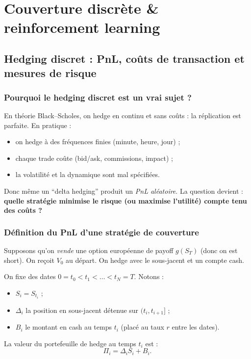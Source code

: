 \documentclass[11pt,a4paper]{report}
\newcommand{\1}{\mathbbm{1}}
\theoremstyle{definition}
\theoremstyle{plain}
\theoremstyle{remark}
\begin{document}
\part{Couverture discrète \& reinforcement learning}

\chapter{Hedging discret : PnL, coûts de transaction et mesures de risque}
\label{chap:discrete_hedging}

\section{Pourquoi le hedging discret est un vrai sujet ?}
En théorie Black--Scholes, on hedge en continu et sans coûts : la réplication est parfaite.
En pratique :
\begin{itemize}
  \item on hedge à des fréquences finies (minute, heure, jour) ;
  \item chaque trade coûte (bid/ask, commissions, impact) ;
  \item la volatilité et la dynamique sont mal spécifiées.
\end{itemize}
Donc même un ``delta hedging'' produit un \emph{PnL aléatoire}.
La question devient : \textbf{quelle stratégie minimise le risque (ou maximise l'utilité) compte tenu des coûts ?}

\section{Définition du PnL d'une stratégie de couverture}
\label{sec:pnl_definition}

Supposons qu'on \emph{vende} une option européenne de payoff $g(S_T)$ (donc on est short).
On reçoit $V_0$ au départ. On hedge avec le sous-jacent et un compte cash.

On fixe des dates $0=t_0<t_1<\dots<t_N=T$.
Notons :
\begin{itemize}
  \item $S_i=S_{t_i}$ ;
  \item $\Delta_i$ la position en sous-jacent détenue sur $(t_i,t_{i+1}]$ ;
  \item $B_i$ le montant en cash au temps $t_i$ (placé au taux $r$ entre les dates).
\end{itemize}

La valeur du portefeuille de hedge au temps $t_i$ est :
\[
\Pi_i = \Delta_i S_i + B_i.
\]
\end{document}
